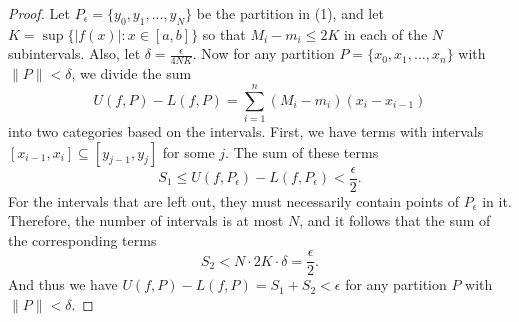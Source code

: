 \documentclass{article}
\begin{document}
\begin{proof}
    Let $P_\epsilon = \{y_0, y_1,...,y_N\}$ be the partition in (1), and let $K = \sup \{|f(x)|: x \in [a,b]\}$ so that $M_i - m_i \leq 2K$ in each of the $N$ subintervals. Also, let $\delta = \frac{\epsilon}{4NK}$. Now for any partition $P = \{x_0, x_1, ..., x_n\}$ with $\|P\| < \delta$, we divide the sum $$U(f,P) - L(f,P) = \sum_{i=1}^n (M_i - m_i) (x_i - x_{i-1})$$ into two categories based on the intervals. First, we have terms with intervals $[x_{i-1}, x_i] \subseteq [y_{j-1}, y_j]$ for some $j$. The sum of these terms $$S_1 \leq U(f, P_\epsilon) - L(f, P_\epsilon) < \frac{\epsilon}{2}.$$ For the intervals that are left out, they must necessarily contain points of $P_\epsilon$ in it. Therefore, the number of intervals is at most $N$, and it follows that the sum of the corresponding terms $$S_2 < N \cdot 2K \cdot \delta = \frac{\epsilon}{2}.$$ And thus we have $U(f,P) - L(f,P) = S_1 + S_2 < \epsilon$ for any partition $P$ with $\|P\| < \delta$.
\end{proof}
\end{document}

